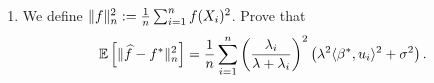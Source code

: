 \documentclass[a4paper,10pt,fleqn]{article}
\newcommand{\E}{\ensuremath{\mathbb{E}}}
\newcommand{\1}{\ensuremath{\mathbbm{1}}}
\begin{document}
\begin{enumerate}
%
	\item We define $\|f\|_{n}^2:= {1\over n}\sum_{i=1}^nf(X_{i})^2$. Prove that
	$$\E\left[\|\widehat f - f^*\|^2_{n} \right]={1\over n}\sum_{i=1}^n \left( \lambda_{i}\over \lambda+\lambda_{i}\right)^2 \left(\lambda^2\langle \beta^*, u_{i}\rangle^2+\sigma^2\right).$$

\vspace{.2cm}

{\em

}
\end{enumerate}
\end{document}
